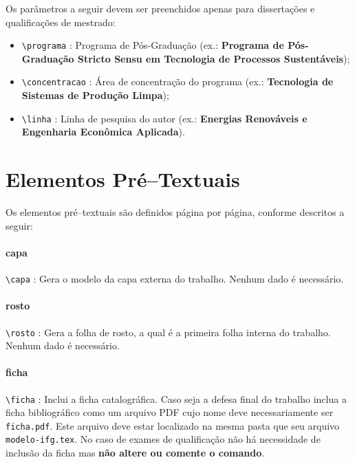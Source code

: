 Os parâmetros a seguir devem ser preenchidos apenas para dissertações e  qualificações de mestrado:

 \begin{itemize}
\item \verb|\programa| : Programa de Pós-Graduação (ex.: \textbf{Programa de Pós-Graduação Stricto Sensu em Tecnologia de Processos Sustentáveis});
\item \verb|\concentracao| : Área de concentração do programa (ex.: \textbf{Tecnologia de Sistemas de Produção Limpa});
\item \verb|\linha| : Linha de pesquisa do autor (ex.: \textbf{Energias Renováveis e Engenharia Econômica Aplicada}).
\end{itemize}

\section{Elementos Pré--Textuais}
\label{sec:pre}
Os elementos pré--textuais são definidos página por página, conforme descritos a seguir:

\paragraph{capa\\}
\verb|\capa| : Gera o modelo da capa externa do trabalho. Nenhum dado é necessário.

\paragraph{rosto\\}
\verb|\rosto| : Gera a folha de rosto, a qual é a primeira folha interna do trabalho. Nenhum dado é necessário.

\paragraph{ficha\\}
\verb|\ficha| : Inclui a ficha catalográfica. Caso seja a defesa final do trabalho inclua a ficha bibliográfico como um arquivo PDF cujo nome deve necessariamente ser \verb|ficha.pdf|. Este arquivo deve estar localizado na mesma pasta que seu arquivo \verb|modelo-ifg.tex|. No caso de exames de qualificação não há necessidade de inclusão da ficha mas \textbf{não altere ou comente o comando}.

